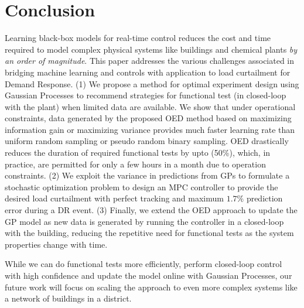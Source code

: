 \section{Conclusion}

Learning black-box models for real-time control reduces the cost and time required to model complex physical systems like buildings and chemical plants \textit{by an order of magnitude}.
This paper addresses the various challenges associated in bridging machine learning and controls with application to load curtailment for Demand Response.
(1) We propose a method for optimal experiment design using Gaussian Processes to recommend strategies for functional test (in closed-loop with the plant) when limited data are available. 
We show that under operational constraints, data generated by the proposed OED method based on maximizing information gain or maximizing variance provides much faster learning rate than uniform random sampling or pseudo random binary sampling. 
OED drastically reduces the duration of required functional tests by upto (50\%), which, in practice, are permitted for only a few hours in a month due to operation constraints.
(2) We exploit the variance in predictions from GPs to formulate a stochastic optimization problem to design an MPC controller to provide the desired load curtailment with perfect tracking and maximum \(1.7\%\) prediction error during a DR event. 
(3) Finally, we extend the OED approach to update the GP model as new data is generated by running the controller in a closed-loop with the building, reducing the repetitive need for functional tests as the system properties change with time.

While we can do functional tests more efficiently, perform closed-loop control with high confidence and update the model online with Gaussian Processes, our future work will focus on scaling the approach to even more complex systems like a network of buildings in a district.